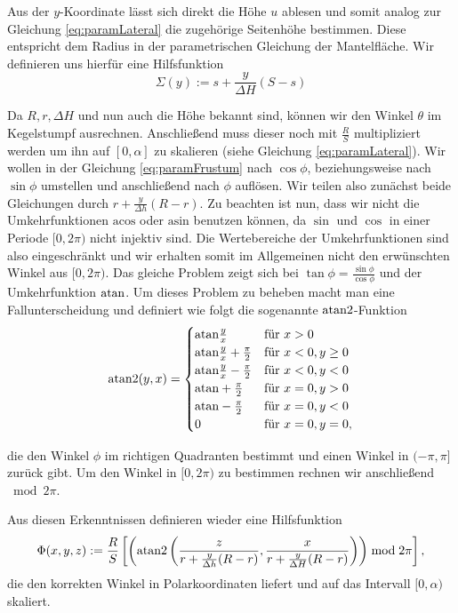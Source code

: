 Aus der $y$-Koordinate lässt sich direkt die Höhe $u$ ablesen und somit analog zur Gleichung \ref{eq:paramLateral} die zugehörige Seitenhöhe bestimmen. Diese entspricht dem Radius in der parametrischen Gleichung  der Mantelfläche.  Wir definieren uns hierfür eine Hilfsfunktion
\begin{equation} \label{eq:help1}
	\Sigma(y) := s + \frac{y}{\Delta H} (S-s)
\end{equation}


Da $R, r, \Delta H$  und nun auch die Höhe bekannt sind, können wir den Winkel $\theta$ im Kegelstumpf ausrechnen. Anschließend muss dieser noch mit  $\frac{R}{S}$ multipliziert werden um ihn auf $[0, \alpha]$ zu skalieren (siehe Gleichung \ref{eq:paramLateral}).  Wir wollen in der Gleichung \ref{eq:paramFrustum} nach $\cos\phi$, beziehungsweise nach $\sin\phi$ umstellen und anschließend nach $\phi$ auflösen. Wir teilen also zunächst beide Gleichungen durch $r + \frac{y}{\Delta h} (R - r)$. Zu beachten ist nun, dass wir nicht die Umkehrfunktionen $\text{acos}$ oder $\text{asin}$ benutzen können, da $\sin$ und $\cos$ in einer Periode $[0, 2\pi)$ nicht injektiv sind. Die Wertebereiche der Umkehrfunktionen sind also eingeschränkt und wir erhalten somit im Allgemeinen nicht den erwünschten Winkel aus $[0, 2\pi)$. Das gleiche Problem zeigt sich bei $\tan\phi = \frac{\sin\phi}{\cos\phi}$ und der Umkehrfunktion $\text{atan}$. Um dieses Problem zu beheben macht man eine Fallunterscheidung und definiert wie folgt die sogenannte $\text{atan2}$-Funktion
\[
\text{atan2}(y,x) = 	\begin{cases}
					\text{atan} \frac{y}{x} 					& \mbox{für } x > 0 \\
					\text{atan} \frac{y}{x} + \frac{\pi}{2}	& \mbox{für } x < 0, y \geq 0 \\
					\text{atan} \frac{y}{x} - \frac{\pi}{2}	& \mbox{für } x < 0, y < 0 \\
					\text{atan} +\frac{\pi}{2}				& \mbox{für } x = 0, y > 0 \\
					\text{atan} -\frac{\pi}{2}				& \mbox{für } x = 0, y < 0 \\
					0									& \mbox{für } x = 0, y = 0,
				\end{cases}
\]

die den Winkel $\phi$ im richtigen Quadranten bestimmt und einen Winkel in $(-\pi, \pi]$ zurück gibt.
Um den Winkel in $[0,2\pi)$ zu bestimmen rechnen wir anschließend $\bmod 2\pi$.

Aus diesen Erkenntnissen definieren wieder eine Hilfsfunktion
\begin{equation} \label{eq:help2}
\Phi(x,y,z) := \frac{R}{S} \left[\left(\text{atan2}\left(\frac{z}{r + \frac{y}{\Delta h} (R - r)}, \frac{x}{r + \frac{y}{\Delta H} (R - r)}\right)\right) \bmod 2\pi \right],
\end{equation}
die den korrekten Winkel in Polarkoordinaten liefert und auf das Intervall $[0, \alpha)$ skaliert.

